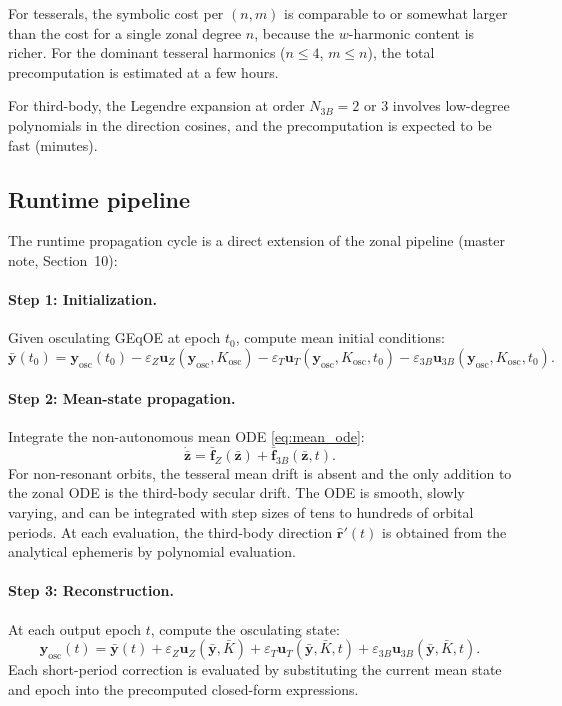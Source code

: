 \documentclass[11pt]{article}
\newcommand{\eps}{\varepsilon}
\begin{document}
For tesserals, the symbolic cost per $(n,m)$ is comparable to or somewhat
larger than the cost for a single zonal degree $n$, because the
$w$-harmonic content is richer. For the dominant tesseral harmonics
($n \le 4$, $m \le n$), the total precomputation is estimated at a few
hours.

For third-body, the Legendre expansion at order $N_{3B} = 2$ or $3$
involves low-degree polynomials in the direction cosines, and the
precomputation is expected to be fast (minutes).

\subsection{Runtime pipeline}

The runtime propagation cycle is a direct extension of the zonal pipeline
(master note, Section~10):

\paragraph{Step 1: Initialization.}
Given osculating GEqOE at epoch $t_0$, compute mean initial conditions:
\begin{equation}
\bar{\bm y}(t_0)
= \bm y_{\mathrm{osc}}(t_0)
- \eps_Z \bm u_Z(\bm y_{\mathrm{osc}}, K_{\mathrm{osc}})
- \eps_T \bm u_T(\bm y_{\mathrm{osc}}, K_{\mathrm{osc}}, t_0)
- \eps_{3B} \bm u_{3B}(\bm y_{\mathrm{osc}}, K_{\mathrm{osc}}, t_0).
\end{equation}

\paragraph{Step 2: Mean-state propagation.}
Integrate the non-autonomous mean ODE \eqref{eq:mean_ode}:
\begin{equation}
\dot{\bar{\bm z}}
= \bar{\bm f}_Z(\bar{\bm z})
+ \bar{\bm f}_{3B}(\bar{\bm z}, t).
\end{equation}
For non-resonant orbits, the tesseral mean drift is absent and the only
addition to the zonal ODE is the third-body secular drift. The ODE is
smooth, slowly varying, and can be integrated with step sizes of tens to
hundreds of orbital periods. At each evaluation, the third-body
direction $\hat{\bm r}'(t)$ is obtained from the analytical ephemeris
by polynomial evaluation.

\paragraph{Step 3: Reconstruction.}
At each output epoch $t$, compute the osculating state:
\begin{equation}
\bm y_{\mathrm{osc}}(t)
= \bar{\bm y}(t)
+ \eps_Z \bm u_Z(\bar{\bm y}, \bar K)
+ \eps_T \bm u_T(\bar{\bm y}, \bar K, t)
+ \eps_{3B} \bm u_{3B}(\bar{\bm y}, \bar K, t).
\end{equation}
Each short-period correction is evaluated by substituting the current mean
state and epoch into the precomputed closed-form expressions.
\end{document}
